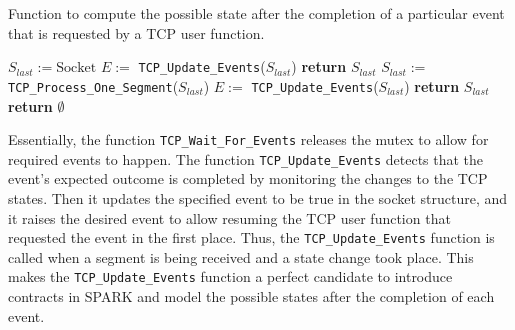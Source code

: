 \documentclass[conference]{IEEEtran}
\def\spark#1{\lstinline[language=Ada]{#1}}
\begin{document}


\begin{algorithm}[t]
    \caption{Function to compute the possible state after the completion of a
particular event that is requested by a TCP user function.}
\label{algo:waitForEvents}
\begin{algorithmic}[1]
\footnotesize
{}
    \State $S_{last} := \text{Socket}$
    \State $E :=$ \spark{TCP_Update_Events}($S_{last}$)
        \State \textbf{return}  $S_{last}$
    \EndIf
        \State $S_{last} :=$ \spark{TCP_Process_One_Segment}($S_{last}$)
        \State $E :=$ \spark{TCP_Update_Events}($S_{last}$)
            \State \textbf{return} $S_{last}$
        \EndIf
    \EndFor
    \State \textbf{return} $\emptyset$
\EndFunction
\end{algorithmic}
\end{algorithm}



Essentially, the function \spark{TCP_Wait_For_Events} releases the mutex to allow for required events to happen. The function \spark{TCP_Update_Events} detects that the event's expected outcome is completed by monitoring the changes to the TCP states. Then it updates the specified event to be true in the socket structure, and it raises the desired event to allow resuming the TCP user function that requested the event in the first place. Thus, the \spark{TCP_Update_Events} function is called when a segment is being received and a state change took place. This makes the \spark{TCP_Update_Events} function a perfect candidate to introduce contracts in SPARK and model the possible states after the completion of each event.
\end{document}

